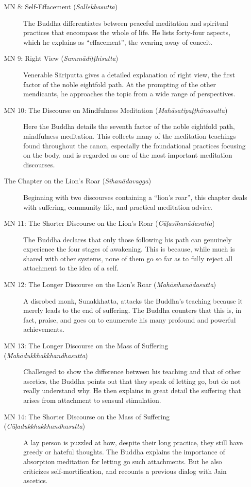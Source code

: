 \documentclass[12pt,openany]{book}%
\begin{document}
\begin{description}
\item[MN 8: Self-Effacement (\textit{\textsanskrit{Sallekhasutta}})] The Buddha differentiates between peaceful meditation and spiritual practices that encompass the whole of life. He lists forty-four aspects, which he explains as “effacement”, the wearing away of conceit.%
\item[MN 9: Right View (\textit{\textsanskrit{Sammādiṭṭhisutta}})] Venerable \textsanskrit{Sāriputta} gives a detailed explanation of right view, the first factor of the noble eightfold path. At the prompting of the other mendicants, he approaches the topic from a wide range of perspectives.%
\item[MN 10: The Discourse on Mindfulness Meditation (\textit{\textsanskrit{Mahāsatipaṭṭhānasutta}})] Here the Buddha details the seventh factor of the noble eightfold path, mindfulness meditation. This collects many of the meditation teachings found throughout the canon, especially the foundational practices focusing on the body, and is regarded as one of the most important meditation discourses.%
\item[The Chapter on the Lion’s Roar (\textit{\textsanskrit{Sīhanādavagga}})] Beginning with two discourses containing a “lion’s roar”, this chapter deals with suffering, community life, and practical meditation advice.%
\item[MN 11: The Shorter Discourse on the Lion’s Roar (\textit{\textsanskrit{Cūḷasīhanādasutta}})] The Buddha declares that only those following his path can genuinely experience the four stages of awakening. This is because, while much is shared with other systems, none of them go so far as to fully reject all attachment to the idea of a self.%
\item[MN 12: The Longer Discourse on the Lion’s Roar (\textit{\textsanskrit{Mahāsīhanādasutta}})] A disrobed monk, Sunakkhatta, attacks the Buddha’s teaching because it merely leads to the end of suffering. The Buddha counters that this is, in fact, praise, and goes on to enumerate his many profound and powerful achievements.%
\item[MN 13: The Longer Discourse on the Mass of Suffering (\textit{\textsanskrit{Mahādukkhakkhandhasutta}})] Challenged to show the difference between his teaching and that of other ascetics, the Buddha points out that they speak of letting go, but do not really understand why. He then explains in great detail the suffering that arises from attachment to sensual stimulation.%
\item[MN 14: The Shorter Discourse on the Mass of Suffering (\textit{\textsanskrit{Cūḷadukkhakkhandhasutta}})] A lay person is puzzled at how, despite their long practice, they still have greedy or hateful thoughts. The Buddha explains the importance of absorption meditation for letting go such attachments. But he also criticizes self-mortification, and recounts a previous dialog with Jain ascetics.%

\end{description}
\end{document}
